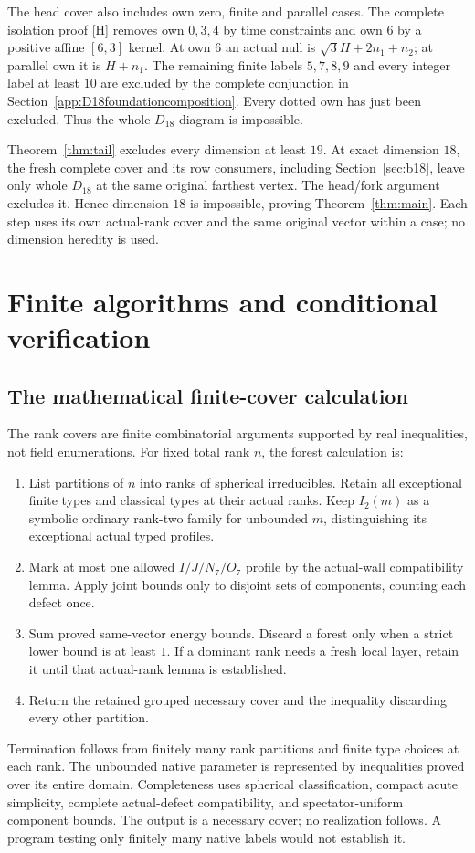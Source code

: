 \documentclass[11pt]{article}
\theoremstyle{definition}
\theoremstyle{remark}
\newcommand{\src}[1]{\textnormal{\textsf{[#1]}}}
\begin{document}
The head cover also includes own zero, finite and parallel
cases. The complete isolation proof \src{H} removes own
\(0,3,4\) by time constraints and own \(6\) by a positive
affine \([6,3]\) kernel. At own \(6\) an actual null is
\(\sqrt3H+2n_1+n_2\); at parallel own it is \(H+n_1\).
The remaining finite labels \(5,7,8,9\) and every integer
label at least \(10\) are excluded by the complete conjunction in
Section~\ref{app:D18foundationcomposition}. Every dotted own has just been excluded.
Thus the whole-\(D_{18}\) diagram is impossible.

Theorem~\ref{thm:tail} excludes every dimension at least \(19\).
At exact dimension \(18\), the fresh complete cover and its
row consumers, including Section~\ref{sec:b18}, leave only
whole \(D_{18}\) at the same original farthest vertex.
The head/fork argument excludes it. Hence dimension \(18\)
is impossible, proving Theorem~\ref{thm:main}. Each step uses its
own actual-rank cover and the same original vector within a case;
no dimension heredity is used.

\section{Finite algorithms and conditional verification}
\label{sec:verification}
\subsection{The mathematical finite-cover calculation}
The rank covers are finite combinatorial arguments supported
by real inequalities, not field enumerations.
For fixed total rank \(n\), the forest calculation is:
\begin{enumerate}
\item List partitions of \(n\) into ranks of spherical irreducibles.
 Retain all exceptional finite types and classical types at
 their actual ranks. Keep \(I_2(m)\) as a symbolic ordinary
 rank-two family for unbounded \(m\), distinguishing its
 exceptional actual typed profiles.
\item Mark at most one allowed \(I/J/N_7/O_7\) profile by the
 actual-wall compatibility lemma. Apply joint bounds only to
 disjoint sets of components, counting each defect once.
\item Sum proved same-vector energy bounds. Discard a forest only
 when a strict lower bound is at least \(1\). If a dominant
 rank needs a fresh local layer, retain it until that
 actual-rank lemma is established.
\item Return the retained grouped necessary cover and the
 inequality discarding every other partition.
\end{enumerate}
Termination follows from finitely many rank partitions and
finite type choices at each rank. The unbounded native
parameter is represented by inequalities proved over its
entire domain. Completeness uses spherical classification,
compact acute simplicity, complete actual-defect compatibility,
and spectator-uniform component bounds. The output is a
necessary cover; no realization follows. A program testing
only finitely many native labels would not establish it.
\end{document}
